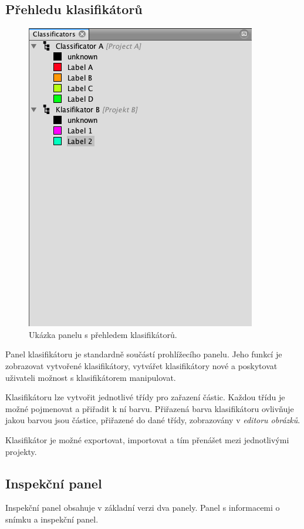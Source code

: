 \documentclass[11pt,twoside,a4paper,table]{book}
\begin{document}
\subsection{Přehledu klasifikátorů}
\begin{figure}[h]
	\centering
	\includegraphics[scale=0.5]{figures/app_class_overview.png}
	\caption{Ukázka panelu s přehledem klasifikátorů.}
\end{figure}

Panel klasifikátoru je standardně součástí prohlížecího panelu. Jeho funkcí je zobrazovat vytvořené klasifikátory, vytvářet klasifikátory nové a poskytovat uživateli možnost s klasifikátorem manipulovat.

Klasifikátoru lze vytvořit jednotlivé třídy pro zařazení částic. Každou třídu je možné pojmenovat a přiřadit k ní barvu. Přiřazená barva klasifikátoru ovlivňuje jakou barvou jsou částice, přiřazené do dané třídy, zobrazovány v \textit{editoru obrázků}.

Klasifikátor je možné exportovat, importovat a tím přenášet mezi jednotlivými projekty.

\subsection{Inspekční panel}
Inspekční panel obsahuje v základní verzi dva panely. Panel s informacemi o snímku a inspekční panel.
\end{document}

